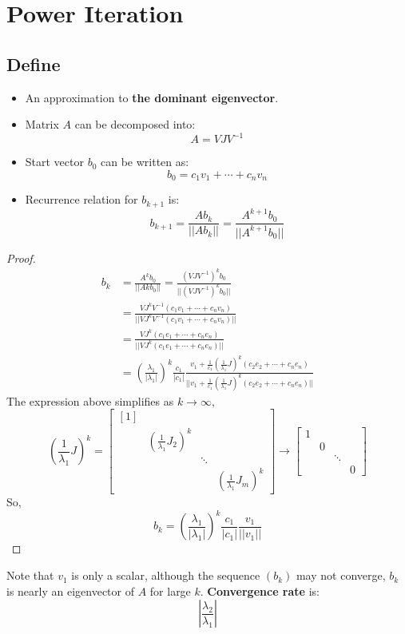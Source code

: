 \section{Power Iteration}
\subsection{Define}
\begin{itemize}
    \item An approximation to \textbf{the dominant eigenvector}.
    \item Matrix $A$ can be decomposed into:
    \[
    A = VJV^{-1}
    \]
    \item Start vector $b_0$ can be written as:
    \[
    b_0 = c_1v_1+\cdots+c_nv_n
    \]
    \item Recurrence relation for $b_{k+1}$ is:
    \[
    b_{k+1}=\frac{Ab_{k}}{||Ab_{k}||}=\frac{A^{k+1}b_0}{||A^{k+1}b_0||}
    \]
\end{itemize}
\begin{proof}
\[
    \begin{aligned}
        b_k &= \frac{A^{k}b_0}{||A{k}b_0||}=\frac{(VJV^{-1})^{k}b_0}{||(VJV^{-1})^{k}b_0||}\\
        &=\frac{VJ^{k}V^{-1}(c_1v_1+\cdots+c_nv_n)}{||VJ^{k}V^{-1}(c_1v_1+\cdots+c_nv_n)||}\\
        &=\frac{VJ^{k}(c_1e_1+\cdots+c_ne_n)}{||VJ^{k}(c_1e_1+\cdots+c_ne_n)||}\\
        &= (\frac{\lambda_1}{|\lambda_1|})^{k}\frac{c_1}{|c_1|}\frac{v_1+\frac{1}{c_1}(\frac{1}{\lambda_1}J)^{k}(c_2e_2+\cdots+c_ne_n)}{||v_1+\frac{1}{c_1}(\frac{1}{\lambda_1}J)^{k}(c_2e_2+\cdots+c_ne_n)||}
    \end{aligned}
\]
The expression above simplifies as $k \to \infty$,
\[
\displaystyle (\frac{1}{\lambda_1}J)^{k} =\left[\begin{array}{cccc}[1] &  & & \\ & (\frac{1}{\lambda_1}J_2)^{k}  & &\\ &  &\ddots  &  \\
   & & & (\frac{1}{\lambda_1}J_m)^{k}\end{array}\right]
   \rightarrow \left[\begin{array}{cccc}1 &  & & \\ & 0 & &\\ &  &\ddots  &  \\
   & & & 0 \end{array}\right]
\]
So, 
\[
    b_k = (\frac{\lambda_1}{|\lambda_1|})^{k}\frac{c_1}{|c_1|}\frac{v_1}{||v_1||}
\]
\end{proof}
Note that $v_1$ is only a scalar, although the sequence $(b_k)$ may not converge, $b_k$ is nearly an eigenvector of $A$ for large $k$.
\textbf{Convergence rate} is:
\begin{equation}
    |\frac{\lambda_2}{\lambda_1}|
\end{equation}


